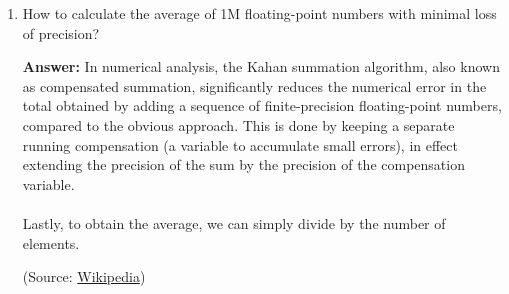 \documentclass{article}
\newenvironment{QandA}{\begin{enumerate}[label=\arabic*.]}{\end{enumerate}}
\newenvironment{answer}{\par\normalfont \textbf{Answer:}}{}
\begin{document}
\begin{QandA}
\begin{answer}
\begin{enumerate}[label=\arabic*.]
\begin{enumerate}
                \item Cast gradients to FP32.
                \item Multiply the weight gradient with 1/S.
                \item Complete the weight update to the FP32 copy.
            \end{enumerate}     
        \end{enumerate}        
        Since all activations are stored in half-precision, we still end up with net reduction in memory, even though we keep 2 copies of the network (single- and half- precision).

        (Source: \href{https://docs.nvidia.com/deeplearning/performance/mixed-precision-training/index.html}{Nvidia})
    \end{answer}

    \item How to calculate the average of 1M floating-point numbers with minimal loss of precision?
    \begin{answer}
        In numerical analysis, the Kahan summation algorithm, also known as compensated summation, significantly reduces the numerical error in the total obtained by adding a sequence of finite-precision floating-point numbers, compared to the obvious approach. This is done by keeping a separate running compensation (a variable to accumulate small errors), in effect extending the precision of the sum by the precision of the compensation variable. \\\\
        Lastly, to obtain the average, we can simply divide by the number of elements. 

        (Source: \href{https://en.wikipedia.org/wiki/Kahan_summation_algorithm}{Wikipedia})
    \end{answer}


\end{QandA}
\end{document}
